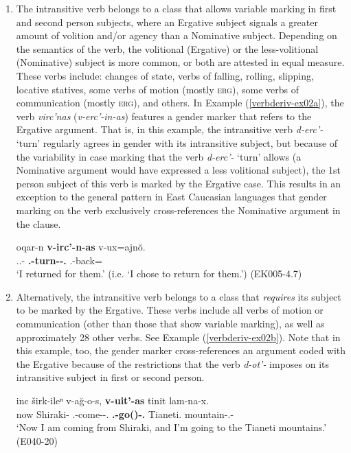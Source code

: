 \begin{enumerate}
\item The intransitive verb belongs to a class that allows variable marking in first and second person subjects, where an Ergative subject signals a greater amount of volition and/or agency than a Nominative subject. Depending on the semantics of the verb, the volitional (Ergative) or the less-volitional (Nominative) subject is more common, or both are attested in equal measure. These verbs include: changes of state, verbs of falling, rolling, slipping, locative statives, some verbs of motion (mostly \textsc{erg}), some verbs of communication (mostly \textsc{erg}), and others. In Example (\ref{verbderiv-ex02a}), the verb \textit{virc'nas} (\textit{v-erc'-in-as}) features a gender marker that refers to the Ergative argument. That is, in this example, the intransitive verb \textit{d-erc'-} `turn' regularly agrees in gender with its intransitive subject, but because of the variability in case marking that the verb \textit{d-erc'-} `turn' allows (a Nominative argument would have expressed a less volitional subject), the 1st person subject of this verb is marked by the Ergative case. This results in an exception to the general pattern in East Caucasian languages that gender marking on the verb exclusively cross-references the Nominative argument in the clause. 

\begin{exe}
	
	\ex\label{verbderiv-ex02a}
	\gll oqar-n \textbf{v-irc'-n-as} v-ux=ajn\u{o}. \\
	{\Dist}.{\Pl}.{\Obl}-{\Dat} \textbf{{\M}.{\Sg}-turn-{\Aor}-\textbf{{\Fsg}.}{\Erg}} {\M}.{\Sg}-back={\Quot} \\
	\trans `I returned for them.' (i.e. `I chose to return for them.')
	\hfill (EK005-4.7)
\end{exe}

\item Alternatively, the intransitive verb belongs to a class that \textit{requires} its subject to be marked by the Ergative. These verbs include all verbs of motion or communication (other than those that show variable marking), as well as approximately 28 other verbs. See Example (\ref{verbderiv-ex02b}). Note that in this example, too, the gender marker cross-references an argument coded with the Ergative because of the restrictions that the verb \textit{d-ot'-} imposes on its intransitive subject in first or second person.

\begin{exe}
	\ex\label{verbderiv-ex02b}
	\gll inc širk-ileⁿ v-a\u{g}-o-s, \textbf{v-uit'-as} tinit lam-na-x.\\
	now Shiraki-{\Elat} {\M}.{\Sg}-come-{\Npst}-{\Fsg}.{\Erg} \textbf{{\M}.{\Sg}-go({\Npst})-{\Fsg}.\textbf{{\Erg}}} Tianeti.{\Ill} mountain-{\Obl}.{\Pl}-{\Cont}\\
	\trans `Now I am coming from Shiraki, and I'm going to the Tianeti mountains.' \hfill\hbox{(E040-20)}
\end{exe}



\end{enumerate}
